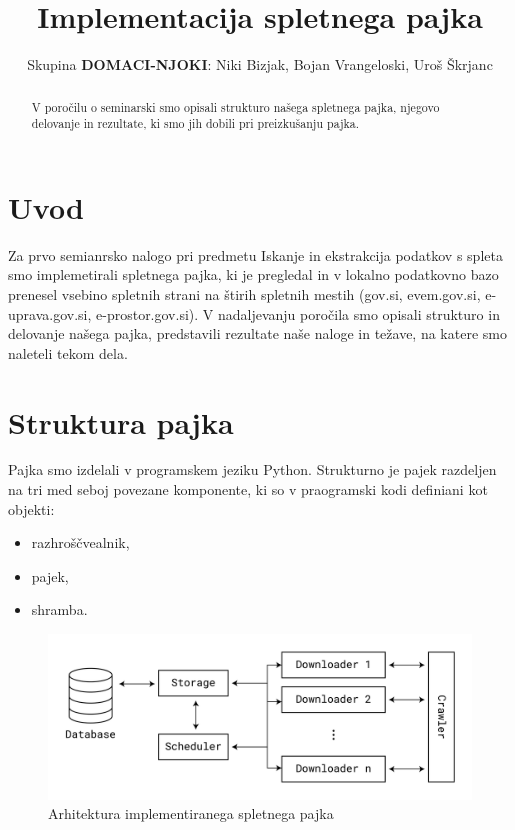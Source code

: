 \documentclass[conference]{IEEEtran}
\begin{document}
	
	\title{Implementacija spletnega pajka}
	
	\author{Skupina \textbf{DOMACI-NJOKI}: Niki Bizjak, Bojan Vrangeloski, Uroš Škrjanc}


	
	\maketitle
	
	\begin{abstract}
		V poročilu o seminarski smo opisali strukturo našega spletnega pajka, njegovo delovanje in rezultate, ki smo jih dobili pri preizkušanju pajka.
	\end{abstract}
	
	\IEEEpeerreviewmaketitle
	
	\section{Uvod}
	
	Za prvo semianrsko nalogo pri predmetu Iskanje in ekstrakcija podatkov s spleta smo implemetirali spletnega pajka, ki je pregledal in v lokalno podatkovno bazo prenesel vsebino spletnih strani na štirih spletnih mestih (gov.si, evem.gov.si, e-uprava.gov.si, e-prostor.gov.si). V nadaljevanju poročila smo opisali strukturo in delovanje našega pajka, predstavili rezultate naše naloge in težave, na katere smo naleteli tekom dela.
	
	\section{Struktura pajka}
	
	Pajka smo izdelali v programskem jeziku Python. Strukturno je pajek razdeljen na tri med seboj povezane komponente, ki so v praogramski kodi definiani kot objekti:
	
	\begin{itemize}
		\item razhroščvealnik,
		\item pajek,
		\item shramba.
	\end{itemize}
	
	
	
	\begin{figure}[h]
		\centering
		\includegraphics[width=.9\linewidth]{images/arhitecture}
		\caption{Arhitektura implementiranega spletnega pajka}
	\end{figure}
\end{document}
